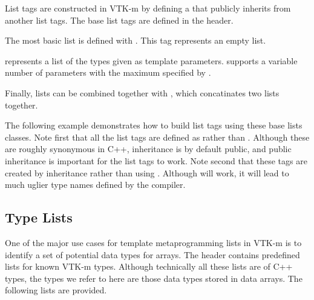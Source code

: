 List tags are constructed in VTK-m by defining a  that
publicly inherits from another list tags. The base list tags are defined in
the  header.

The most basic list is defined with . This tag
represents an empty list.

 represents a list of the types given as
template parameters.  supports a variable number of
parameters with the maximum specified by .

Finally, lists can be combined together with
, which concatinates two lists
together.

The following example demonstrates how to build list tags using these base
lists classes. Note first that all the list tags are defined as
 rather than . Although these are roughly
synonymous in C++,  inheritance is by default public, and
public inheritance is important for the list tags to work. Note second that
these tags are created by inheritance rather than using
. Although  will work, it will lead to
much uglier type names defined by the compiler.


\subsection{Type Lists}
\label{sec:TypeLists}


One of the major use cases for template metaprogramming lists in VTK-m is
to identify a set of potential data types for arrays. The
 header contains predefined lists for known
VTK-m types. Although technically all these lists are of C++ types, the
types we refer to here are those data types stored in data arrays. The
following lists are provided.

